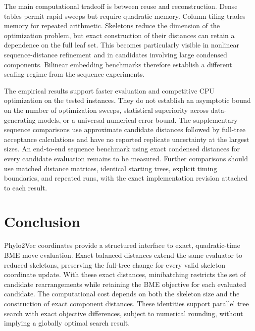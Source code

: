 \documentclass[11pt,a4paper]{article}
\makeatletter
\DeclareRobustCommand{\_}{\ifmmode\nfss@text{\textunderscore}\else\textunderscore\allowbreak\fi}
\theoremstyle{definition}
\makeatother
\begin{document}
The main computational tradeoff is between reuse and reconstruction.
Dense tables permit rapid sweeps but require quadratic memory.
Column tiling trades memory for repeated arithmetic.
Skeletons reduce the dimension of the optimization problem, but exact construction of their distances can retain a dependence on the full leaf set.
This becomes particularly visible in nonlinear sequence-distance refinement and in candidates involving large condensed components.
Bilinear embedding benchmarks therefore establish a different scaling regime from the sequence experiments.

The empirical results support faster evaluation and competitive CPU optimization on the tested instances.
They do not establish an asymptotic bound on the number of optimization sweeps, statistical superiority across data-generating models, or a universal numerical error bound.
The supplementary sequence comparisons use approximate candidate distances followed by full-tree acceptance calculations and have no reported replicate uncertainty at the largest sizes.
An end-to-end sequence benchmark using exact condensed distances for every candidate evaluation remains to be measured.
Further comparisons should use matched distance matrices, identical starting trees, explicit timing boundaries, and repeated runs, with the exact implementation revision attached to each result.

\section{Conclusion}

Phylo2Vec coordinates provide a structured interface to exact, quadratic-time BME move evaluation.
Exact balanced distances extend the same evaluator to reduced skeletons, preserving the full-tree change for every valid skeleton coordinate update.
With these exact distances, minibatching restricts the set of candidate rearrangements while retaining the BME objective for each evaluated candidate.
The computational cost depends on both the skeleton size and the construction of exact component distances.
These identities support parallel tree search with exact objective differences, subject to numerical rounding, without implying a globally optimal search result.



\clearpage
\appendix

\end{document}
